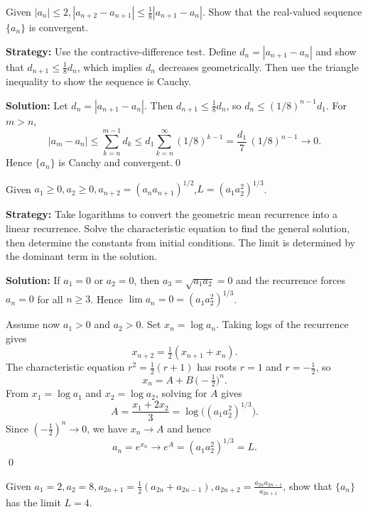 \begin{problembox}
Given \(|a_n| \leq 2, |a_{n+2} - a_{n+1}| \leq \frac{1}{8} |a_{n+1} - a_n|\). Show that the real-valued sequence \(\{a_n\}\) is convergent.
\end{problembox}

\noindent\textbf{Strategy:} Use the contractive-difference test. Define \(d_n=|a_{n+1}-a_n|\) and show that \(d_{n+1}\le \frac{1}{8}d_n\), which implies \(d_n\) decreases geometrically. Then use the triangle inequality to show the sequence is Cauchy.

\bigskip\noindent\textbf{Solution:}
Let \(d_n=|a_{n+1}-a_n|\). Then \(d_{n+1}\le \tfrac{1}{8}d_n\), so \(d_n\le (1/8)^{n-1} d_1\). For \(m>n\),
\[|a_m-a_n|\le \sum_{k=n}^{m-1} d_k \le d_1\sum_{k=n}^{\infty} (1/8)^{k-1}=\frac{d_1}{7}\,(1/8)^{n-1}\to 0.\]
Hence \(\{a_n\}\) is Cauchy and convergent.\qed


\begin{problembox}
Given \(a_1 \geq 0, a_2 \geq 0, a_{n+2} = (a_n a_{n+1})^{1/2}\),\(L = (a_1 a_2^2)^{1/3}\).
\end{problembox}

\noindent\textbf{Strategy:} Take logarithms to convert the geometric mean recurrence into a linear recurrence. Solve the characteristic equation to find the general solution, then determine the constants from initial conditions. The limit is determined by the dominant term in the solution.

\bigskip\noindent\textbf{Solution:}
If \(a_1=0\) or \(a_2=0\), then \(a_3=\sqrt{a_1 a_2}=0\) and the recurrence forces \(a_n=0\) for all \(n\ge 3\). Hence \(\lim a_n=0=(a_1 a_2^2)^{1/3}\).

Assume now \(a_1>0\) and \(a_2>0\). Set \(x_n=\log a_n\). Taking logs of the recurrence gives
\[x_{n+2}=\tfrac{1}{2}(x_{n+1}+x_n).\]
The characteristic equation \(r^2=\tfrac{1}{2}(r+1)\) has roots \(r=1\) and \(r=-\tfrac{1}{2}\), so
\[x_n=A+B\,\big(-\tfrac{1}{2}\big)^{n}.\]
From \(x_1=\log a_1\) and \(x_2=\log a_2\), solving for \(A\) gives
\[A=\frac{x_1+2x_2}{3}=\log\big((a_1 a_2^2)^{1/3}\big).\]
Since \(({-}\tfrac{1}{2})^{n}\to 0\), we have \(x_n\to A\) and hence
\[a_n=e^{x_n}\longrightarrow e^{A}=(a_1 a_2^2)^{1/3}=L.\]\qed


\begin{problembox}
Given \(a_1 = 2, a_2 = 8, a_{2n+1} = \frac{1}{2}(a_{2n} + a_{2n-1}), a_{2n+2} = \frac{a_{2n} a_{2n-1}}{a_{2n+1}}\), show that \(\{a_n\}\) has the limit \(L = 4\).
\end{problembox}

